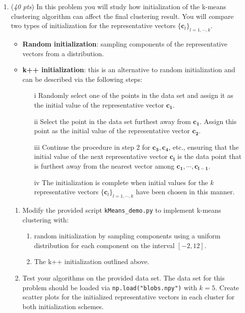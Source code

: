 \documentclass[10pt,twoside]{article}
\renewcommand{\vec}[1]{\mathbf{#1}}
\begin{document}
\begin{enumerate}




\item (\emph{40 pts}) In this problem you will study how initialization of the k-means clustering algorithm can affect the final clustering result. You will compare two types of initialization for the representative vectors $\{\vec{c}_l\}_{l=1,\cdots, k}$.
\begin{itemize}
\item \textbf{Random initialization}: sampling components of the representative vectors from a distribution.
\item \textbf{k++ initialization}: this is an alternative to random initialization and can be described via the following steps:
\begin{enumerate}
\item[i] Randomly select one of the points in the data set and assign it as the initial value of the representative vector $\vec{c_1}$.
\item[ii] Select the point in the data set furthest away from $\vec{c_1}$. Assign this point as the initial value of the representative vector $\vec{c_2}$.
\item[iii] Continue the procedure in step 2 for $\vec{c_3}, \vec{c_4}$, etc., ensuring that the initial value of the next representative vector $\vec{c_l}$ is the data point that is furthest away from the nearest vector among $\vec{c_1}, \cdots,\vec{c_{l-1}}$.
\item[iv] The initialization is complete when initial values for the $k$ representative vectors $\{\vec{c}_l\}_{l=1,\cdots, k}$ have been chosen in this manner.
\end{enumerate}
\end{itemize}

\begin{enumerate}
\item Modify the provided script \texttt{kMeans\_demo.py} to implement k-means clustering with:
\begin{enumerate}
\item random initialization by sampling components using a uniform distribution for each component on the interval $[-2, 12]$.
\item The k++ initialization outlined above.
\end{enumerate}

\item Test your algorithms on the provided data set. The data set for this problem should be loaded via \texttt{np.load("blobs.npy")} with $k = 5$. Create scatter plots for the initialized representative vectors in each cluster for both initialization schemes.


\end{enumerate}
\end{enumerate}
\end{document}
